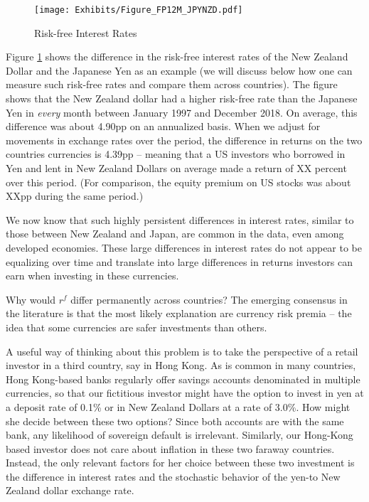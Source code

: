 \begin{figure}
  \centering
  \caption{Risk-free Interest Rates}
  \texttt{[image: Exhibits/Figure\_FP12M\_JPYNZD.pdf]}
  \label{fig:fp}
\end{figure}
Figure \ref{fig:fp} shows the difference in the risk-free interest
rates of the New Zealand Dollar and the Japanese Yen as an example (we
will discuss below how one can measure such risk-free rates and
compare them across countries). The figure shows that the New Zealand
dollar had a higher risk-free rate than the Japanese Yen in
\textit{every} month between January 1997 and December 2018. On average,
this difference was about 4.90pp on an annualized basis. When we
adjust for movements in exchange rates over the period, the difference
in returns on the two countries currencies is 4.39pp -- meaning that a
US investors who borrowed in Yen and lent in New Zealand Dollars on
average made a return of XX percent over this period. (For comparison,
the equity premium on US stocks was about XXpp during the same
period.)

We now know that such highly persistent differences in interest rates,
similar to those between New Zealand and Japan, are common in the
data, even among developed economies. These large differences in
interest rates do not appear to be equalizing over time and translate
into large differences in returns investors can earn when investing in
these currencies.

Why would $r^f$ differ permanently across countries? The emerging
consensus in the literature is that the most likely explanation are
currency risk premia -- the idea that some currencies are safer
investments than others.

A useful way of thinking about this problem is to take the perspective
of a retail investor in a third country, say in Hong Kong. As is
common in many countries, Hong Kong-based banks regularly offer
savings accounts denominated in multiple currencies, so that our
fictitious investor might have the option to invest in yen at a
deposit rate of 0.1\% or in New Zealand Dollars at a rate of 3.0\%.
How might she decide between these two options? Since both accounts
are with the same bank, any likelihood of sovereign default is
irrelevant. Similarly, our Hong-Kong based investor does not care
about inflation in these two faraway countries. Instead, the only
relevant factors for her choice between these two investment is the
difference in interest rates and the stochastic behavior of the yen-to
New Zealand dollar exchange rate.

